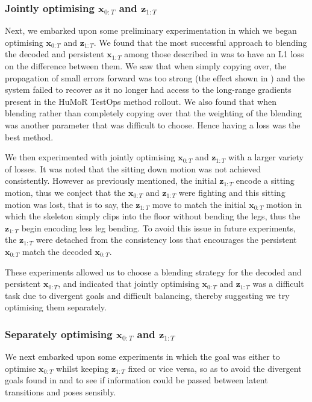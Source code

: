 \subsubsection{Jointly optimising $\mathbf{x}_{0:T}$ and $\mathbf{z}_{1:T}$}
\label{sec:humor_experiments_jointly_optimising}
Next, we embarked upon some preliminary experimentation in which we began optimising $\mathbf{x}_{0:T}$ and $\mathbf{z}_{1:T}$. We found that the most successful approach to blending the decoded and persistent  $\mathbf{x}_{1:T}$ among those described in  was to have an L1 loss on the difference between them. We saw that when simply copying over, the propagation of small errors forward was too strong (the effect shown in ) and the system failed to recover as it no longer had access to the long-range gradients present in the HuMoR TestOps method rollout. We also found that when blending rather than completely copying over that the weighting of the blending was another parameter that was difficult to choose. Hence having a loss was the best method.

We then experimented with jointly optimising $\mathbf{x}_{0:T}$ and $\mathbf{z}_{1:T}$ with a larger variety of losses. It was noted that the sitting down motion was not achieved consistently. However as previously mentioned, the initial $\mathbf{z}_{1:T}$ encode a sitting motion, thus we conject that the $\mathbf{x}_{0:T}$ and $\mathbf{z}_{1:T}$ were fighting and this sitting motion was lost, that is to say, the $\mathbf{z}_{1:T}$ move to match the initial $\mathbf{x}_{0:T}$ motion in which the skeleton simply clips into the floor without bending the legs, thus the $\mathbf{z}_{1:T}$ begin encoding less leg bending. To avoid this issue in future experiments, the $\mathbf{z}_{1:T}$ were detached from the consistency loss that encourages the persistent $\mathbf{x}_{0:T}$ match the decoded $\mathbf{x}_{0:T}$.

These experiments allowed us to choose a blending strategy for the decoded and persistent $\mathbf{x}_{0:T}$, and indicated that jointly optimising $\mathbf{x}_{0:T}$ and $\mathbf{z}_{1:T}$ was a difficult task due to divergent goals and difficult balancing, thereby suggesting we try optimising them separately.

\subsubsection{Separately optimising $\mathbf{x}_{0:T}$ and $\mathbf{z}_{1:T}$}
We next embarked upon some experiments in which the goal was either to optimise $\mathbf{x}_{0:T}$ whilst keeping $\mathbf{z}_{1:T}$ fixed or vice versa, so as to avoid the divergent goals found in  and to see if information could be passed between latent transitions and poses sensibly.


